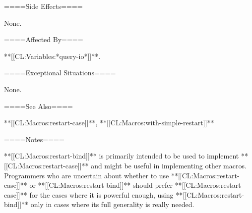 \endlist

====Side Effects====

None.

====Affected By====

**[[CL:Variables:*query-io*]]**.

====Exceptional Situations====

None.

====See Also====

**[[CL:Macros:restart-case]]**, **[[CL:Macros:with-simple-restart]]**

====Notes====

**[[CL:Macros:restart-bind]]** is primarily intended to be used to implement **[[CL:Macros:restart-case]]** and might be useful in implementing other macros. Programmers who are uncertain about whether to use **[[CL:Macros:restart-case]]** or **[[CL:Macros:restart-bind]]** should prefer **[[CL:Macros:restart-case]]** for the cases where it is powerful enough, using **[[CL:Macros:restart-bind]]** only in cases where its full generality is really needed.


